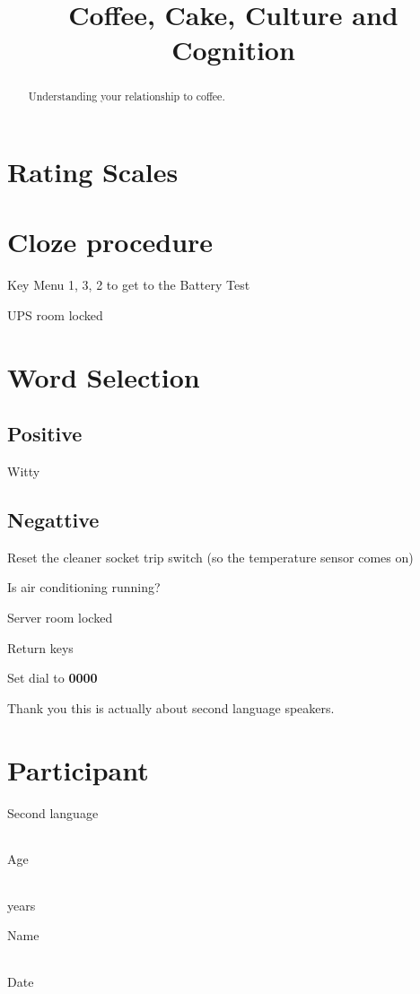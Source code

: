 \documentclass[a4paper, 10pt]{article}
\title{Coffee, Cake, Culture and Cognition}
\author{}
\newcommand{\fillbox}[1][60]{\begin{tabular}{|l|}
  \hspace{#1 pt} \\
  \hline
\end{tabular} }
\begin{document}
\begin{abstract}
  Understanding your relationship to coffee.
\end{abstract}



\section{Rating Scales}



\section{Cloze procedure}

\begin{todolist}
  \item Key Menu 1, 3, 2 to get to the Battery Test
  \item UPS room locked
\end{todolist}

\section{Word Selection}

\subsection{Positive}

\begin{todolist}
  \item Witty
\end{todolist}

\subsection{Negattive}

\begin{todolist}
  \item Reset the cleaner socket trip switch (so the temperature sensor comes on)
  \item Is air conditioning running?
  \item Server room locked
  \item Return keys
  \item Set dial to {\bf 0000}
\end{todolist}

Thank you this is actually about second language speakers.

\section{Participant}

\begin{todolist}
  \item Second language \fillbox[300]
  \item Age \fillbox years
  \item Name \fillbox[300]
  \item Date \fillbox \fillbox \fillbox
\end{todolist}
\end{document}
